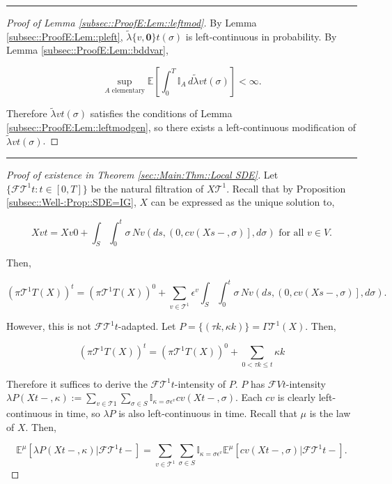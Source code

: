 \documentclass[12pt]{article}
\newcommand{\mb}{\mathbb}
\newcommand{\mc}{\mathcal}
\newcommand{\te}{\text}
\newcommand{\ep}{\epsilon}
\newcommand{\lin}{\rule{\linewidth}{0.4 pt}}
\newcommand{\ex}[1]{\mb{E}\left[#1\right]}			%
\newcommand{\exmu}[2]{\mb{E}^{#1}\left[#2\right]}	%
\renewcommand{\root}{\mathbf{0}}				%
\renewcommand{\v}{v}							%
\renewcommand{\S}{S}							%
\newcommand{\s}{\sigma}							%
\newcommand{\ev}{\ep}							%
\newcommand{\T}{T}								%
\renewcommand{\t}{t}							%
\newcommand{\proj}{\pi}							%
\renewcommand{\tt}{s}							%
\newcommand{\F}{\mc{F}}							%
\newcommand{\X}{X}								%
\newcommand{\IGr}{c}							%
\newcommand{\vind}[1]{^{#1}}					%
\newcommand{\tree}{\mc{T}}						%
\newcommand{\sln}[1]{^{#1}}						%
\newcommand{\poiss}{N}							%
\newcommand{\rate}{\lambda}						%
\newcommand{\alt}[1]{\widetilde{#1}}			%
\newcommand{\m}{\mu}							%
\newcommand{\rt}{\tau}							%
\renewcommand{\it}{k}							%
\newcommand{\pmap}{\Gamma}						%
\renewcommand{\mark}{\kappa}					%
\newcommand{\rp}{P}								%
\newcommand{\typset}{A}							%
\newcommand{\crate}{\alt{\lambda}}				%
\begin{document}
\lin

\begin{proof}[Proof of Lemma \ref{subsec::ProofE:Lem::leftmod}]

By Lemma \ref{subsec::ProofE:Lem::pleft}, \(\crate{\{\v,\root\}}{\t}(\s)\) is left-continuous in probability. By Lemma \ref{subsec::ProofE:Lem::bddvar},

\[\sup_{\typset\te{ elementary}} \ex{\int_0^\T \mb{I}_{\typset}\,d\crate{\v}{\t}(\s)} < \infty.\]

Therefore \(\crate{\v}{\t}(\s)\) satisfies the conditions of Lemma \ref{subsec::ProofE:Lem::leftmodgen}, so there exists a left-continuous modification of \(\crate{\v}{\t}(\s)\).
\end{proof}

\lin

\begin{proof}[Proof of existence in Theorem \ref{sec::Main:Thm::Local SDE}]

Let \(\{\F{\tree\sln{1}}{\t}:\t\in [0,\T]\}\) be the natural filtration of \(\X{\tree\sln{1}}{}\). Recall that by Proposition \ref{subsec::Well-:Prop::SDE=IG}, \(\X{}{}\) can be expressed as the unique solution to,

\[\X{\v}{\t} = \X{\v}{0} + \int_\S\int_0^\t \s\,\poiss{\v}\left(d\tt,\left(0,c{\v}(\X{}{\tt-},\s)\right],d\s\right) \te{ for all } \v \in V.\]

Then,

\[\left(\proj{\tree\sln{1}}{\T}(\X{}{})\right)^\t = \left(\proj{\tree\sln{1}}{\T}(\X{}{})\right)^0 + \sum_{\v \in \tree\sln{1}}\ev\vind{\v}\int_\S\int_0^\t \s\,\poiss{\v}\left(d\tt,\left(0,\IGr{\v}(\X{}{\tt-},\s)\right],d\s\right).\]

However, this is not \(\F{\tree\sln{1}}{\t}\)-adapted. Let \(\rp{} = \{(\rt{\it},\mark{\it})\} = \pmap{\tree\sln{1}}(\X{}{}).\) Then,

\[\left(\proj{\tree\sln{1}}{\T}(\X{}{})\right)^\t = \left(\proj{\tree\sln{1}}{\T}(\X{}{})\right)^0 + \sum_{0 < \rt{\it} \leq \t}\mark{\it}\]

Therefore it suffices to derive the \(\F{\tree\sln{1}}{\t}\)-intensity of \(\rp{}\). \(\rp{}\) has \(\F{V}{\t}\)-intensity \(\rate{\rp{}}(\X{}{\t-},\mark{}) := \sum_{\v \in \tree{1}}\sum_{\s\in \S}\mb{I}_{\mark{} = \s\ev\vind{\v}}\IGr{\v}(\X{}{\t-},\s)\). Each \(\IGr{\v}\) is clearly left-continuous in time, so \(\rate{\rp{}}\) is also left-continuous in time. Recall that \(\m{}{}{}\) is the law of \(\X{}{}\). Then,

\[\exmu{\m{}{}{}}{\rate{\rp{}}(\X{}{\t-},\mark{})|\F{\tree\sln{1}}{\t-}} = \sum_{\v \in \tree\sln{1}}\sum_{\s\in \S} \mb{I}_{\mark{} = \s\ev\vind{\v}}\exmu{\m{}{}{}}{\IGr{\v}(\X{}{\t-},\s)|\F{\tree\sln{1}}{\t-}}.\]


\end{proof}
\end{document}
